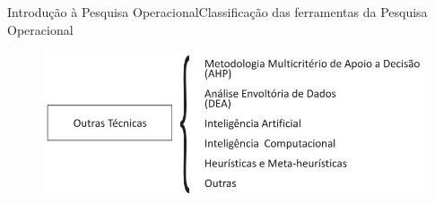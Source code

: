 \documentclass[t]{beamer}
\begin{document}

\begin{ftst}{Introdução à Pesquisa Operacional}{Classificação das ferramentas da Pesquisa Operacional}

\begin{figure}
    \centering
    \includegraphics[scale=0.5]{Figuras/outras_tecnicas.jpg}
\end{figure}
\end{ftst}

\end{document}
